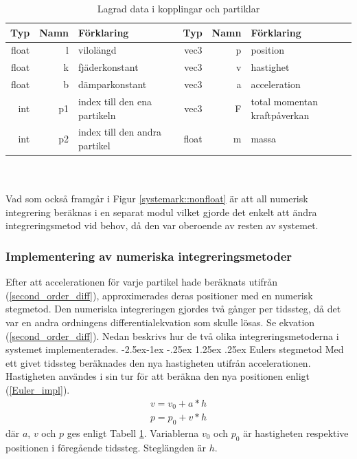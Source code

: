 \documentclass[a4paper,12pt,oneside,final,swedish]{extarticle}
\makeatletter
\renewcommand\paragraph{\@startsection{paragraph}{4}{\z@}%
            {-2.5ex\@plus -1ex \@minus -.25ex}%
            {1.25ex \@plus .25ex}%
            {\normalfont\normalsize\bfseries}}
\makeatother
\begin{document}
\begin{table}[h!]
  \centering
  \caption{Lagrad data i kopplingar och partiklar}
  \begin{tabular}{| r r l | r r l |}
    \hline
    \bfseries Typ & \bfseries Namn & \bfseries Förklaring & \bfseries Typ & \bfseries Namn & \bfseries Förklaring\\
    \hline
    float & l & vilolängd & vec3 & p & position\\ 
    float & k & fjäderkonstant & vec3 & v & hastighet\\ 
    float & b & dämparkonstant & vec3 & a & acceleration\\ 
    int & p1 & index till den ena partikeln & vec3 & F & total momentan kraftpåverkan\\ 
    int & p2 & index till den andra partikel & float & m & massa \\
    \hline
    \end{tabular}
  \label{table_ark} %
\end{table}
\\\\
Vad som också framgår i Figur \ref{systemark::nonfloat} är att all numerisk integrering beräknas i en separat modul vilket gjorde det enkelt att ändra integreringsmetod vid behov, då den var oberoende av resten av systemet.

\subsubsection{Implementering av numeriska integreringsmetoder}
Efter att accelerationen för varje partikel hade beräknats utifrån (\ref{second_order_diff}), approximerades deras positioner med en numerisk stegmetod. Den numeriska integreringen gjordes två gånger per tidssteg, då det var en andra ordningens differentialekvation som skulle lösas. Se ekvation (\ref{second_order_diff}). Nedan beskrivs hur de två olika integreringsmetoderna i systemet implementerades.
\paragraph{Eulers stegmetod} 
Med ett givet tidssteg beräknades den nya hastigheten utifrån accelerationen. Hastigheten användes i sin tur för att beräkna den nya positionen enligt (\ref{Euler_impl}).
	\begin{equation}
	\begin{split} 
	v = v_0 + a*h\\
	p = p_0 + v*h
	\end{split} 
	\label{Euler_impl}
	\end{equation}
där $a$, $v$ och $p$ ges enligt Tabell \ref{table_ark}. Variablerna $v_0$ och $p_0$ är hastigheten respektive positionen i föregående tidssteg. Steglängden är $h$.
\end{document}
